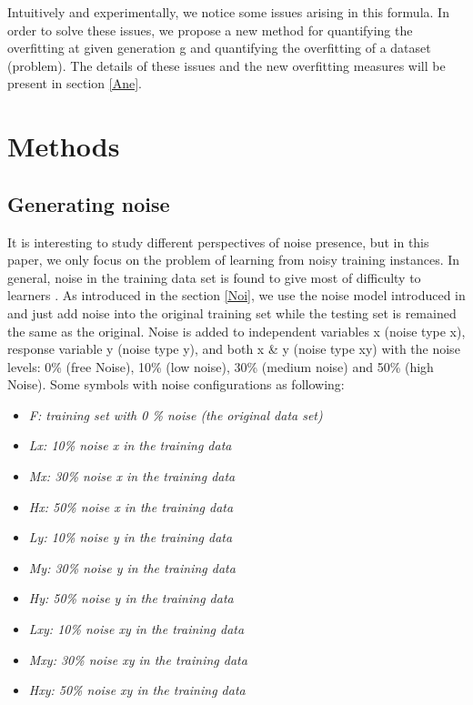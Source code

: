 Intuitively and experimentally, we notice some issues arising in this formula. In order to solve these issues, we propose a new method for quantifying the overfitting at given generation g and quantifying the overfitting of a dataset (problem). The details of these issues and the new overfitting measures will be present in section \ref{Ane}.

\section{Methods}
\label{Met}
\subsection{Generating noise}
\label{Gen}
It is interesting to study different perspectives of noise presence, but in this paper, we only focus on the problem of learning from noisy training instances. In general, noise in the training data set is found to give most of difficulty to learners \cite{2011Nic}. As introduced in the section \ref{Noi}, we use the noise model introduced in \cite{2010Dav} and just add noise into the original training set while the testing set is remained the same as the original.  Noise is added to independent variables x (noise type x), response variable y (noise type y), and both x \& y (noise type xy) with the noise levels: 0\% (free Noise), 10\% (low noise), 30\% (medium noise) and 50\% (high Noise). Some symbols with noise configurations as following:\par
\begin{itemize}
\item \textit{F: training set with 0 \% noise (the original data set)}
\item \textit{Lx: 10\% noise x in the training data}
\item \textit{Mx: 30\% noise x in the training data}
\item \textit{Hx: 50\% noise x in the training data}
\item \textit{Ly: 10\% noise y in the training data}
\item \textit{My: 30\% noise y in the training data}
\item \textit{Hy: 50\% noise y in the training data}
\item \textit{Lxy: 10\% noise xy in the training data}
\item \textit{Mxy: 30\% noise xy in the training data}
\item \textit{Hxy: 50\% noise xy in the training data}
\end{itemize} \par
